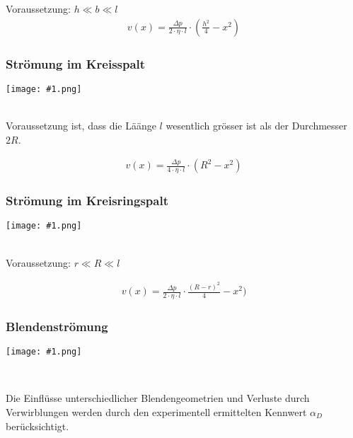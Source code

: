 \documentclass[landscape,a4paper,10pt]{article}
\newcommand{\graphiccol}[1]{
\noindent
\begin{minipage}{\columnwidth}
\centering
\texttt{[image: \#1.png]}
\end{minipage}
\medskip \\
}
\begin{document}
\begin{multicols*}{3}
Voraussetzung: $h \ll b \ll l$ \\


\begin{align*}
v(x) = \frac{\Delta p}{2 \cdot \eta \cdot l} \cdot ( \frac{h^2}{4} - x^2)
\end{align*}



\subsubsection{Strömung im Kreisspalt}
\graphiccol{kreisspalt}
Voraussetzung ist, dass die Läänge $l$ wesentlich grösser ist als der Durchmesser $2R$.
 
\begin{align*}
v(x) = \frac{\Delta p}{4 \cdot \eta \cdot l} \cdot (R^2 - x^2)
\end{align*}



\subsubsection{Strömung im Kreisringspalt}
\graphiccol{kreisringspalt}

Voraussetzung: $r \ll R \ll l$

\begin{align*}
v(x) = \frac{\Delta p}{2 \cdot \eta \cdot l} \cdot \frac{(R-r)^2}{4} - x^2)
\end{align*}



\subsubsection{Blendenströmung}
\graphiccol{blendensroemung}



Die Einflüsse unterschiedlicher Blendengeometrien und Verluste durch Verwirblungen werden durch den experimentell ermittelten Kennwert $\alpha_D$ berücksichtigt.



\end{multicols*}
\end{document}
